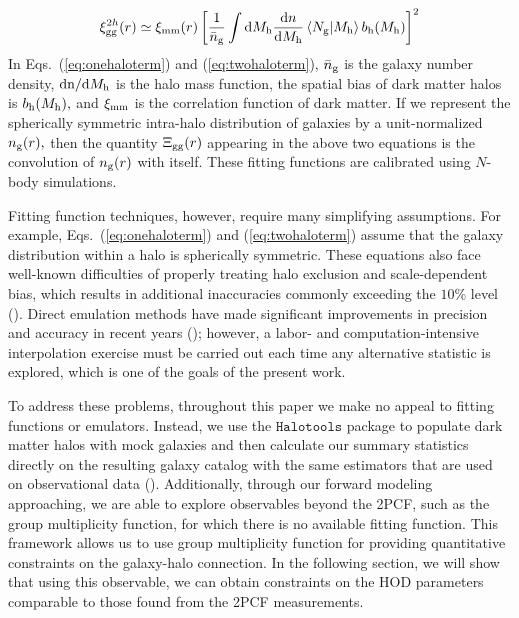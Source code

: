 \documentclass[fleqn,usenatbib]{mnras}
\begin{document}
\begin{eqnarray}
\label{eq:twohaloterm}
\xi^{2h}_{\mathrm{gg}}(r) \simeq \xi_{\mathrm{mm}}(r)\left[\frac{1}{\bar{n}_{\mathrm{g}}}\int\mathrm{d}M_{\rm h}\frac{\mathrm{d} n}{\mathrm{d}M_{\rm h}} \left\langle N_{\mathrm{g}} \vert {M_{\rm h}}\right\rangle b_{\mathrm{h}}(M_{\rm h})\right]^{2}
\end{eqnarray}
In Eqs.~(\ref{eq:onehaloterm}) and (\ref{eq:twohaloterm}), $\bar{n}_{\mathrm{g}}$ is the galaxy number density,
$\mathrm{d}\mathrm{n}/\mathrm{d}M_{\rm h}$ is the halo mass function, the spatial bias of dark matter halos is 
$b_{\mathrm{h}}(M_{\rm h}),$ and $\xi_{\rm mm}$ is the correlation function of dark matter.  
If we represent the spherically symmetric intra-halo distribution of galaxies by a unit-normalized 
$n_{\rm g}(r),$ then the quantity $\Xi_{\rm gg}(r)$ appearing in the above two equations 
is the convolution of $n_{\rm g}(r)$ with itself. These fitting functions are calibrated using $N$-body 
simulations. 

Fitting function techniques, however, require many simplifying assumptions. For example, 
Eqs.~(\ref{eq:onehaloterm}) and (\ref{eq:twohaloterm}) assume that the galaxy 
distribution within a halo is spherically symmetric. These equations 
also face well-known difficulties of properly treating halo exclusion and scale-dependent bias, 
which results in additional inaccuracies commonly exceeding the $10\%$ level (\citealt{vdBosch13}). 
Direct emulation methods have made significant improvements in precision and accuracy in recent 
years (\citealt{coyote2,coyote1}); however, a labor- and computation-intensive interpolation 
exercise must be carried out each time any alternative statistic is explored, which is one of the goals of the present work.

To address these problems, throughout this paper we make no appeal to fitting functions or emulators. 
Instead, we use the $\mathtt{Halotools}$ package to populate dark matter halos with mock galaxies and 
then calculate our summary statistics directly on the resulting galaxy catalog with the same estimators 
that are used on observational data (\citealt{Hearin:2016aa}). Additionally, through our forward modeling approaching, we are
able to explore observables beyond the 2PCF, such as the group multiplicity function, for which 
there is no available fitting function. This framework allows us to use group multiplicity function for providing quantitative constraints on the galaxy-halo connection. In the following section, we will show that using this observable, we can obtain constraints on the HOD parameters comparable to those found from the 2PCF measurements. 
\end{document}
